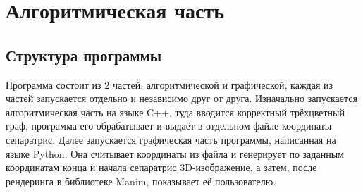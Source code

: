 	\section{Алгоритмическая часть}
	\subsection{Структура программы}
	\hspace{0.5 cm} Программа состоит из 2 частей: алгоритмической и графической, каждая из частей запускается отдельно и независимо друг от друга. Изначально запускается алгоритмическая часть на языке C++, туда вводится корректный трёхцветный граф, программа его обрабатывает и выдаёт в отдельном файле координаты сепаратрис. Далее запускается графическая часть программы, написанная на языке Python. Она считывает координаты из файла и генерирует по заданным координатам конца и начала сепаратрис 3D-изображение, а затем, после рендеринга в библиотеке Manim, показывает её пользователю.
